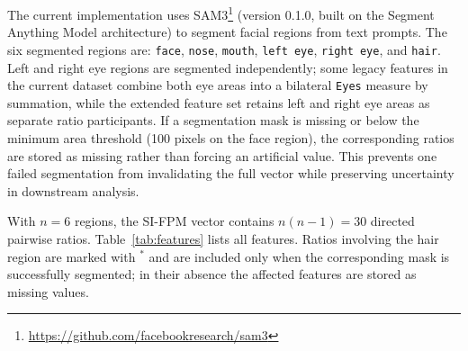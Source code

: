 \documentclass{article}
\begin{document}
The current implementation uses SAM3\footnote{\url{https://github.com/facebookresearch/sam3}} (version 0.1.0, built on the Segment Anything Model architecture) to segment facial regions from text prompts. The six segmented regions are: \texttt{face}, \texttt{nose}, \texttt{mouth}, \texttt{left eye}, \texttt{right eye}, and \texttt{hair}. Left and right eye regions are segmented independently; some legacy features in the current dataset combine both eye areas into a bilateral \texttt{Eyes} measure by summation, while the extended feature set retains left and right eye areas as separate ratio participants. If a segmentation mask is missing or below the minimum area threshold (100 pixels on the face region), the corresponding ratios are stored as missing rather than forcing an artificial value. This prevents one failed segmentation from invalidating the full vector while preserving uncertainty in downstream analysis.

With $n = 6$ regions, the SI-FPM vector contains $n(n-1) = 30$ directed pairwise ratios. Table~\ref{tab:features} lists all features. Ratios involving the hair region are marked with $^*$ and are included only when the corresponding mask is successfully segmented; in their absence the affected features are stored as missing values.
\end{document}
